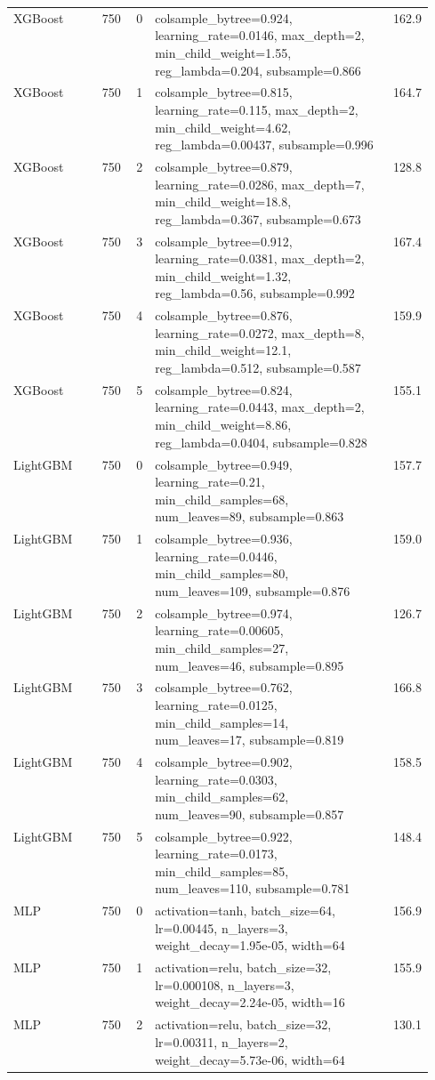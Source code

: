 \begin{longtable}{lrrp{0.55\linewidth}r}
XGBoost & 750 & 0 & colsample\_bytree=0.924, learning\_rate=0.0146, max\_depth=2, min\_child\_weight=1.55, reg\_lambda=0.204, subsample=0.866 & 162.9 \\
XGBoost & 750 & 1 & colsample\_bytree=0.815, learning\_rate=0.115, max\_depth=2, min\_child\_weight=4.62, reg\_lambda=0.00437, subsample=0.996 & 164.7 \\
XGBoost & 750 & 2 & colsample\_bytree=0.879, learning\_rate=0.0286, max\_depth=7, min\_child\_weight=18.8, reg\_lambda=0.367, subsample=0.673 & 128.8 \\
XGBoost & 750 & 3 & colsample\_bytree=0.912, learning\_rate=0.0381, max\_depth=2, min\_child\_weight=1.32, reg\_lambda=0.56, subsample=0.992 & 167.4 \\
XGBoost & 750 & 4 & colsample\_bytree=0.876, learning\_rate=0.0272, max\_depth=8, min\_child\_weight=12.1, reg\_lambda=0.512, subsample=0.587 & 159.9 \\
XGBoost & 750 & 5 & colsample\_bytree=0.824, learning\_rate=0.0443, max\_depth=2, min\_child\_weight=8.86, reg\_lambda=0.0404, subsample=0.828 & 155.1 \\
LightGBM & 750 & 0 & colsample\_bytree=0.949, learning\_rate=0.21, min\_child\_samples=68, num\_leaves=89, subsample=0.863 & 157.7 \\
LightGBM & 750 & 1 & colsample\_bytree=0.936, learning\_rate=0.0446, min\_child\_samples=80, num\_leaves=109, subsample=0.876 & 159.0 \\
LightGBM & 750 & 2 & colsample\_bytree=0.974, learning\_rate=0.00605, min\_child\_samples=27, num\_leaves=46, subsample=0.895 & 126.7 \\
LightGBM & 750 & 3 & colsample\_bytree=0.762, learning\_rate=0.0125, min\_child\_samples=14, num\_leaves=17, subsample=0.819 & 166.8 \\
LightGBM & 750 & 4 & colsample\_bytree=0.902, learning\_rate=0.0303, min\_child\_samples=62, num\_leaves=90, subsample=0.857 & 158.5 \\
LightGBM & 750 & 5 & colsample\_bytree=0.922, learning\_rate=0.0173, min\_child\_samples=85, num\_leaves=110, subsample=0.781 & 148.4 \\
MLP & 750 & 0 & activation=tanh, batch\_size=64, lr=0.00445, n\_layers=3, weight\_decay=1.95e-05, width=64 & 156.9 \\
MLP & 750 & 1 & activation=relu, batch\_size=32, lr=0.000108, n\_layers=3, weight\_decay=2.24e-05, width=16 & 155.9 \\
MLP & 750 & 2 & activation=relu, batch\_size=32, lr=0.00311, n\_layers=2, weight\_decay=5.73e-06, width=64 & 130.1 \\

\end{longtable}
